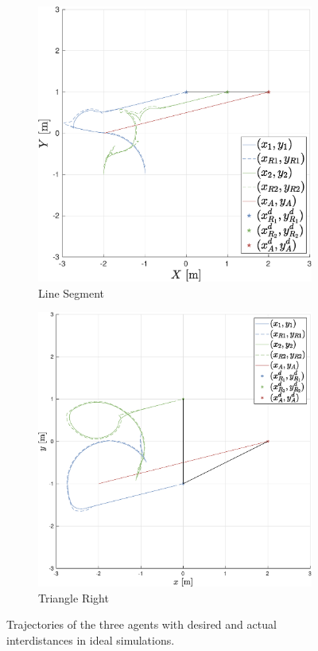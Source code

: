 \documentclass{ifacconf}
\begin{document}
\begin{figure}
\begin{subfigure}[b]{0.32\columnwidth}
        \includegraphics[width=\linewidth]{images/simulations/with_APF/not_noisy/2nd_scenario_with_noNoise.eps}
        \caption{Line Segment}
         \label{fig:sim_withAPF_noNoise_2}
    \end{subfigure}
    \begin{subfigure}[b]{0.32\columnwidth}
        \centering
        \includegraphics[width=\linewidth]{images/simulations/with_APF/not_noisy/3rd_scenario_with_noNoise.eps}
      \caption{Triangle Right}
         \label{fig:sim_withAPF_noNoise_3}
    \end{subfigure}
    \vspace{-0.2cm}
    \caption{Trajectories of the three agents with desired and actual interdistances in ideal simulations.}
    \label{fig:sim_withAPF_noNoise}
\end{figure}
\end{document}
